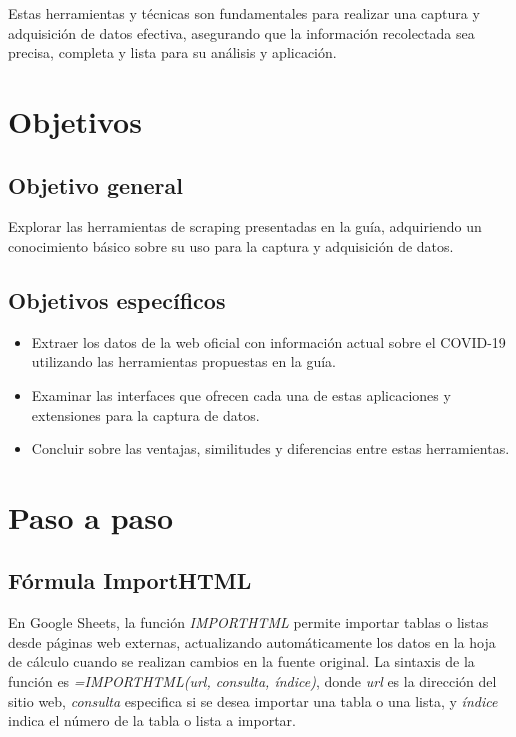 \documentclass[12pt]{article}
\begin{document}
        Estas herramientas y técnicas son fundamentales para realizar una captura y adquisición de datos efectiva, asegurando que la información recolectada sea precisa, completa y lista para su análisis y aplicación.
        

        \newpage
        \section{Objetivos}
                \subsection{Objetivo general}
                        Explorar las herramientas de scraping presentadas en la guía, adquiriendo un conocimiento básico sobre su uso para la captura y adquisición de datos.

                \subsection{Objetivos específicos}
                        \begin{itemize}
                        \item Extraer los datos de la web oficial con información actual sobre el COVID-19 utilizando las herramientas propuestas en la guía.
                        \item Examinar las interfaces que ofrecen cada una de estas aplicaciones y extensiones para la captura de datos.
                        \item Concluir sobre las ventajas, similitudes y diferencias entre estas herramientas.
                        \end{itemize}


        \newpage
        \section{Paso a paso}
                \subsection{Fórmula ImportHTML}
                        En Google Sheets, la función \textit{IMPORTHTML} permite importar tablas o listas desde páginas web externas, actualizando automáticamente los datos en la hoja de cálculo cuando se realizan cambios en la fuente original. La sintaxis de la función es \textit{=IMPORTHTML(url, consulta, índice)}, donde \textit{url} es la dirección del sitio web, \textit{consulta} especifica si se desea importar una tabla o una lista, y \textit{índice} indica el número de la tabla o lista a importar. 
                        
\end{document}
